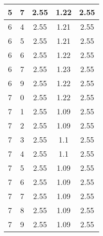 \begin{longtable}{|c|c||c||c||c|}
	5 & 7 & 2.55 & 1.22 & 2.55 \\ \hline
	6 & 4 & 2.55 & 1.21 & 2.55 \\ \hline
	6 & 5 & 2.55 & 1.21 & 2.55 \\ \hline
	6 & 6 & 2.55 & 1.22 & 2.55 \\ \hline
	6 & 7 & 2.55 & 1.23 & 2.55 \\ \hline
	6 & 9 & 2.55 & 1.22 & 2.55 \\ \hline
	7 & 0 & 2.55 & 1.22 & 2.55 \\ \hline
	7 & 1 & 2.55 & 1.09 & 2.55 \\ \hline
	7 & 2 & 2.55 & 1.09 & 2.55 \\ \hline
	7 & 3 & 2.55 & 1.1 & 2.55 \\ \hline
	7 & 4 & 2.55 & 1.1 & 2.55 \\ \hline
	7 & 5 & 2.55 & 1.09 & 2.55 \\ \hline
	7 & 6 & 2.55 & 1.09 & 2.55 \\ \hline
	7 & 7 & 2.55 & 1.09 & 2.55 \\ \hline
	7 & 8 & 2.55 & 1.09 & 2.55 \\ \hline
	7 & 9 & 2.55 & 1.09 & 2.55 \\ \hline
\end{longtable}
\clearpage{}
